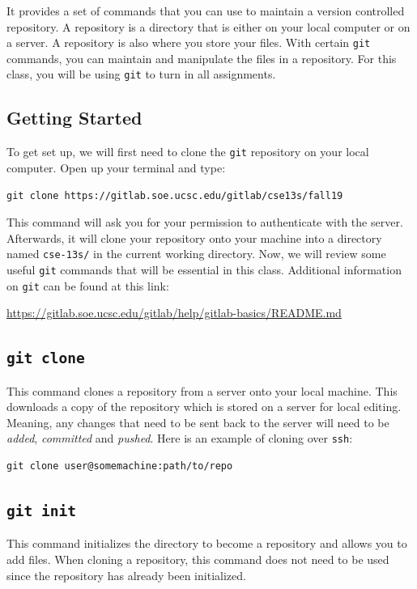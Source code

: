 \documentclass[11pt]{article}
\begin{document}
It provides a set of commands that you can use to maintain a version
controlled repository. A repository is a directory that is either on
your local computer or on a server. A repository is also where you
store your files. With certain \texttt{git} commands, you can
maintain and manipulate the files in a repository. For this class,
you will be using \texttt{git} to turn in all assignments.

\subsection{Getting Started}
To get set up, we will first need to clone the \texttt{git} repository on your local computer. Open up your terminal and type:
\begin{lstlisting}
git clone https://gitlab.soe.ucsc.edu/gitlab/cse13s/fall19
\end{lstlisting}

This command will ask you for your permission to authenticate with
the server. Afterwards, it will clone your repository onto your
machine into a directory named \texttt{cse-13s/} in the current working
directory. Now, we will review some useful \texttt{git} commands
that will be essential in this class. Additional information on
\texttt{git} can be found at this link:

\centerline{\url{https://gitlab.soe.ucsc.edu/gitlab/help/gitlab-basics/README.md}}

\subsection{\texttt{git clone}}
This command clones a repository from a server onto your local machine. This
downloads a copy of the repository which is stored on a server for local
editing. Meaning, any changes that need to be sent back to the server will need
to be \emph{added}, \emph{committed} and \emph{pushed}. Here is an example of
cloning over \texttt{ssh}:
\begin{lstlisting}
git clone user@somemachine:path/to/repo
\end{lstlisting}

\subsection{\texttt{git init}}
This command initializes the directory to become a repository and allows you to add files. When cloning a repository, this command does not need to be used since the repository has already been initialized.
\end{document}
